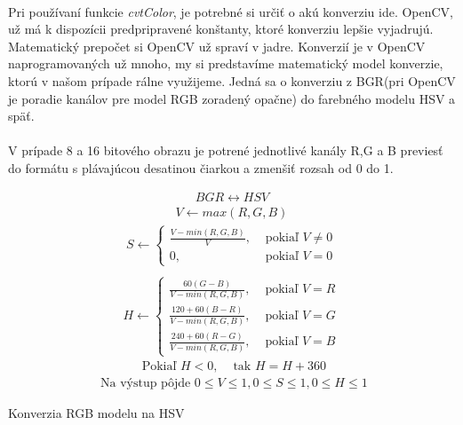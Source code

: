 \documentclass[12pt]{article}
\begin{document}
\paragraph{}
Pri používaní funkcie \emph{cvtColor}, je potrebné si určiť o akú konverziu ide. OpenCV, už má k dispozícii predpripravené konštanty, ktoré konverziu lepšie vyjadrujú.
Matematický prepočet si OpenCV už spraví v jadre. Konverzií je v OpenCV naprogramovaných už mnoho, my si predstavíme matematický model konverzie,
ktorú v našom prípade rálne využijeme. Jedná sa o konverziu z BGR(pri OpenCV je poradie kanálov pre model RGB zoradený opačne) do farebného modelu HSV a späť.
\cite{cvtColor}
\cite{OpenCVDoc}
\paragraph{} 
V prípade 8 a 16 bitového obrazu je potrené jednotlivé kanály R,G a B previesť do formátu s plávajúcou desatinou čiarkou a zmenšiť rozsah od 0 do 1.
\begin{table}
\begin{align*}
BGR \leftrightarrow HSV
\end{align*}
\begin{align*}
V \leftarrow max(R,G,B)
\end{align*}
\begin{align*}
S \leftarrow \begin{cases} \frac{V - min(R,G,B)}{V}, & \text{ pokiaľ } V \neq 0 \\ 0, & \text{ pokiaľ } V = 0 \end{cases} \\
\end{align*}
\begin{align*}
H \leftarrow \begin{cases} \frac{60(G - B)}{V - min(R,G,B)}, & \text{ pokiaľ } V = R \\ \frac{120 + 60(B - R)}{V - min(R,G,B)}, & \text{ pokiaľ } V = G \\ \frac{240 + 60(R - G)}{V - min(R,G,B)}, & \text{ pokiaľ } V = B \end{cases} 
\end{align*}
\begin{align*}
\text{ Pokiaľ } H < 0, & \text{ tak } H = H + 360
\end{align*}
\begin{align*}
\text{ Na výstup pôjde } 0 \le V \le 1, 0 \le S \le 1, 0 \le H \le 1
\end{align*}
\caption{Konverzia RGB modelu na HSV\cite{hsv_wiki_cz}\cite{cvtColor}\cite{OpenCVDoc}}
\label{cvtColorEquals}
\end{table}
\end{document}
